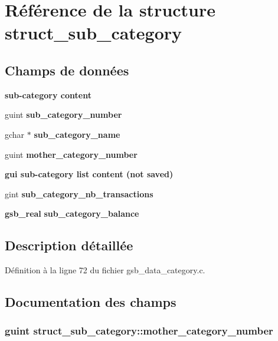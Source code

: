 \section{Référence de la structure struct\_\-sub\_\-category}
\label{structstruct__sub__category}
\subsection*{Champs de données}
\begin{Indent}{\bf sub-\/category content}\par
{\em \label{_amgrp8b5c98637d7dd57a21d085037cfef591}
 }\begin{DoxyCompactItemize}
\item 
guint {\bf sub\_\-category\_\-number}
\item 
gchar $\ast$ {\bf sub\_\-category\_\-name}
\item 
guint {\bf mother\_\-category\_\-number}
\end{DoxyCompactItemize}
\end{Indent}
\begin{Indent}{\bf gui sub-\/category list content (not saved)}\par
{\em \label{_amgrp6cf2a6a49fb1ea722355f32ee1ce0e2f}
 }\begin{DoxyCompactItemize}
\item 
gint {\bf sub\_\-category\_\-nb\_\-transactions}
\item 
{\bf gsb\_\-real} {\bf sub\_\-category\_\-balance}
\end{DoxyCompactItemize}
\end{Indent}


\subsection{Description détaillée}


Définition à la ligne 72 du fichier gsb\_\-data\_\-category.c.



\subsection{Documentation des champs}
\subsubsection[{mother\_\-category\_\-number}]{\setlength{\rightskip}{0pt plus 5cm}guint {\bf struct\_\-sub\_\-category::mother\_\-category\_\-number}}\label{structstruct__sub__category_a3da8627848f394079103034baeddf60a}


